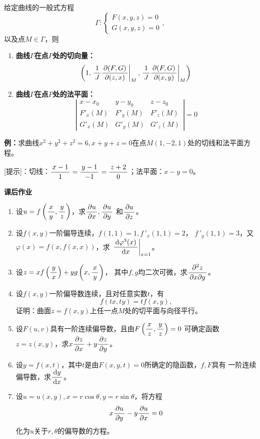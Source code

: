 \begin{thx}
	给定曲线的一般式方程
	$$\Gamma: \left\{\begin{array}{l}
		F(x,y,z)=0\\ G(x,y,z)=0
	\end{array}\right.,$$
	以及点$M\in\Gamma$，则
	\begin{enumerate}
	  \item {\bf 曲线$\Gamma$在点$P$处的切向量：} 
	  $$\left(1,\left.\df 1J\df{\p(F,G)}{\p(z,x)}\right|_M,
	  \left.\df 1J\df{\p(F,G)}{\p(x,y)}\right|_M\right)$$
	  \item {\bf 曲线$\Gamma$在点$P$处的法平面：}
	  $$\left|
	  		\begin{array}{ccc}
	  			x-x_0 & y-y_0 & z-z_0\\
	  			F'_x(M) & F'_y(M) & F'_z(M)\\
	  			G'_x(M) & G'_y(M) & G'_z(M)
	  		\end{array}
	  	\right|=0$$
	\end{enumerate}
\end{thx}

{\bf 例：}求曲线$x^2+y^2+z^2=6,x+y+z=0$在点$M(1,-2,1)$处的切线和法平面方程。

[提示]：切线：$\df{x-1}1=\df{y-1}{-1}=\df{z+2}0$；法平面：$x-y=0$。

\begin{ext}
	{\bf 课后作业}
	\begin{enumerate}
	  \item 设$u=f\left(\df xy,\df yz\right)$，求$\df {\p u}{\p x},\df {\p u}{\p y}$
  	  和$\df {\p u}{\p z}$。
	  \item 设$f(x,y)$一阶偏导连续，$f(1,1)=1,f\,'_x(1,1)=2$，
		$f\,'_y(1,1)=3$，又$\varphi(x)=f(x,f(x,x))$，求
		$\left.\df{\d\varphi^3(x)}{\d x}\right|_{x=1}$。
	  \item 设$z=xf\left(\df yx\right)+yg\left(x,\df xy\right)$，
	  其中$f,g$均二次可微，求$\df{\p^2 z}{\p x\p y}$。
	  \item 设$f(x,y)$一阶偏导数连续，且对任意实数$t$，有
	  $$f(tx,ty)=tf(x,y),$$
	  证明：曲面$z=f(x,y)$上任一点$M$处的切平面与向径平行。
	  \item 设$F(u,v)$具有一阶连续偏导数，且由$F\left(\df xz,\df yz\right)=0$
	  可确定函数$z=z(x,y)$，求$x\df{\p z}{\p x}+y\df{\p z}{\p y}$。
	  \item 设$y=f(x,t)$，其中$t$是由$F(x,y,t)=0$所确定的隐函数，$f,F$具有
	  一阶连续偏导数，求$\df{\d y}{\d x}$。
	  \item 设$u=u(x,y),x=r\cos\theta,y=r\sin\theta$，将方程
	  $$x\df{\p u}{\p y}-y\df{\p u}{\p x}=0$$
	  化为$u$关于$r,\theta$的偏导数的方程。
	\end{enumerate}
\end{ext}

